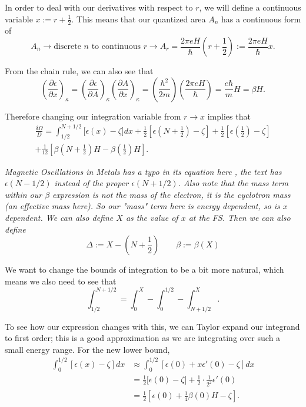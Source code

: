 \documentclass[12pt]{revtex4-2}
\begin{document}
In order to deal with our derivatives with respect to $r$, we will define a continuous variable $x := r + \frac{1}{2}$.  This means that our quantized area $A_n$ has a continuous form of
\begin{equation}
    A_n \to \text{discrete $n$ to continuous $r$} \to A_r = \frac{2\pi eH}{\hbar}\left( r + \frac{1}{2} \right) := \frac{2\pi eH}{\hbar}x.
\end{equation}

From the chain rule, we can also see that
\begin{equation}
    \left( \frac{\partial\epsilon}{\partial x} \right)_\kappa = \left( \frac{\partial\epsilon}{\partial A} \right)_\kappa \left( \frac{\partial A}{\partial x} \right)_\kappa = \left(\frac{\hbar^2}{2m}\right)\left( \frac{2\pi eH}{\hbar} \right) = \frac{e\hbar}{m}H = \beta H.
\end{equation}

Therefore changing our integration variable from $r \to x$ implies that 
\begin{multline}\label{eqn:dO-over-D-pre-expansion}
    \frac{\delta\Omega}{D} = \int_{1/2}^{N + 1/2} \big[ \epsilon(x) - \zeta \big]dx + \frac{1}{2}\left[ \epsilon\left(N + \frac{1}{2}\right) - \zeta \right] + \frac{1}{2}\left[ \epsilon\left(\frac{1}{2}\right) - \zeta \right] \\
    + \frac{1}{12}\left[ \beta\left(N + \frac{1}{2}\right)H - \beta\left(\frac{1}{2}\right)H \right].
\end{multline}

\em Magnetic Oscillations in Metals has a typo in its equation here \em, the text has $\epsilon(N - 1/2)$ instead of the proper $\epsilon(N+1/2)$.  Also note that the mass term within our $\beta$ expression is \em not \em the mass of the electron, it is the cyclotron mass (an effective mass here).  So our "mass" term here is energy dependent, so is $x$ dependent.  We can also define $X$ as the value of $x$ at the FS.  Then we can also define
\begin{equation}
    \Delta := X - \left( N + \frac{1}{2} \right) \qquad \beta := \beta(X)
\end{equation}

We want to change the bounds of integration to be a bit more natural, which means we also need to see that 
\begin{equation}
    \int_{1/2}^{N+1/2} = \int_0^X - \int_0^{1/2} - \int_{N+1/2}^X.
\end{equation}

To see how our expression changes with this, we can Taylor expand our integrand to first order; this is a good approximation as we are integrating over such a small energy range.  For the new lower bound, 
\begin{align}
    \int_0^{1/2} [\epsilon(x)-\zeta]dx &\approx \int_0^{1/2} [\epsilon(0) + x\epsilon'(0) - \zeta]dx \\
    &= \frac{1}{2}\big[ \epsilon(0) - \zeta \big] + \frac{1}{2}\cdot\frac{1}{2^2}\epsilon'(0) \\
    &= \frac{1}{2}\left[ \epsilon(0) + \frac{1}{4}\beta(0)H - \zeta \right].
\end{align}
\end{document}
